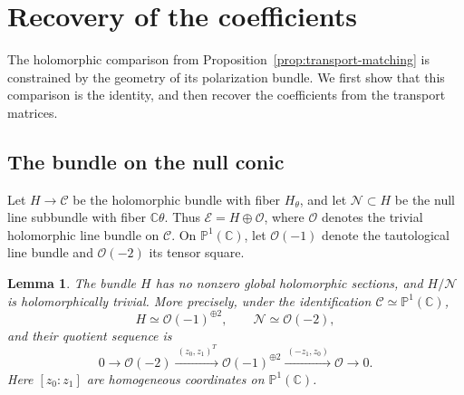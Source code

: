 \documentclass[11pt]{article}
\newcommand{\C}{\mathbb C}
\newcommand{\Ecal}{\mathcal E}
\newtheorem{lemma}[theorem]{Lemma}
\theoremstyle{remark}
\numberwithin{equation}{section}
\begin{document}
\section{Recovery of the coefficients}\label{sec:coefficient-recovery}

The holomorphic comparison from Proposition~\ref{prop:transport-matching}
is constrained by the geometry of its polarization bundle.  We first show
that this comparison is the identity, and then recover the coefficients from
the transport matrices.

\subsection{The bundle on the null conic}

Let $H\to\mathcal C$ be the holomorphic bundle with fiber $H_\theta$, and
let $\mathcal N\subset H$ be the null line subbundle with fiber
$\C\theta$.  Thus $\Ecal=H\oplus\mathcal O$, where $\mathcal O$ denotes
the trivial holomorphic line bundle on $\mathcal C$.
On $\mathbb P^1(\C)$, let $\mathcal O(-1)$ denote the tautological line
bundle and $\mathcal O(-2)$ its tensor square.

\begin{lemma}\label{lem:conic-bundle}
The bundle $H$ has no nonzero global holomorphic sections, and
$H/\mathcal N$ is holomorphically trivial.  More precisely, under the
identification $\mathcal C\simeq\mathbb P^1(\C)$,
\[
 H\simeq\mathcal O(-1)^{\oplus2},\qquad
 \mathcal N\simeq\mathcal O(-2),
\]
and their quotient sequence is
\begin{equation}\label{eq:conic-quotient}
 0\longrightarrow\mathcal O(-2)
 \xrightarrow{\ (z_0,z_1)^T\ }
 \mathcal O(-1)^{\oplus2}
 \xrightarrow{\ (-z_1,z_0)\ }
 \mathcal O\longrightarrow0.
\end{equation}
Here $[z_0:z_1]$ are homogeneous coordinates on $\mathbb P^1(\C)$.
\end{lemma}
\end{document}
